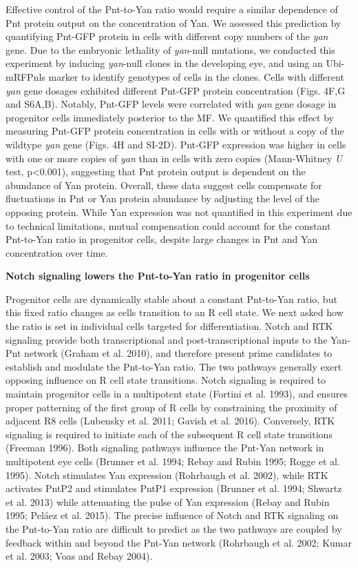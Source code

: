 Effective control of the Pnt-to-Yan ratio would require a similar dependence of Pnt protein output on the concentration of Yan. We assessed this prediction by quantifying Pnt-GFP protein in cells with different copy numbers of the \textit{yan} gene. Due to the embryonic lethality of \textit{yan}-null mutations, we conducted this experiment by inducing \textit{yan}-null clones in the developing eye, and using an Ubi-mRFPnls marker to identify genotypes of cells in the clones. Cells with different \textit{yan} gene dosages exhibited different Pnt-GFP protein concentration (Figs. 4F,G and S6A,B). Notably, Pnt-GFP levels were correlated with \textit{yan} gene dosage in progenitor cells immediately posterior to the MF. We quantified this effect by measuring Pnt-GFP protein concentration in cells with or without a copy of the wildtype \textit{yan} gene (Figs. 4H and SI-2D). Pnt-GFP expression was higher in cells with one or more copies of \textit{yan} than in cells with zero copies (Mann-Whitney \textit{U} test, p\textless{}0.001), suggesting that Pnt protein output is dependent on the abundance of Yan protein. Overall, these data suggest cells compensate for fluctuations in Pnt or Yan protein abundance by adjusting the level of the opposing protein. While Yan expression was not quantified in this experiment due to technical limitations, mutual compensation could account for the constant Pnt-to-Yan ratio in progenitor cells, despite large changes in Pnt and Yan concentration over time.

\textbf{Notch signaling lowers the Pnt-to-Yan ratio in progenitor cells}

Progenitor cells are dynamically stable about a constant Pnt-to-Yan ratio, but this fixed ratio changes as cells transition to an R cell state. We next asked how the ratio is set in individual cells targeted for differentiation. Notch and RTK signaling provide both transcriptional and post-transcriptional inputs to the Yan-Pnt network (Graham et al. 2010), and therefore present prime candidates to establish and modulate the Pnt-to-Yan ratio. The two pathways generally exert opposing influence on R cell state transitions. Notch signaling is required to maintain progenitor cells in a multipotent state (Fortini et al. 1993), and ensures proper patterning of the first group of R cells by constraining the proximity of adjacent R8 cells (Lubensky et al. 2011; Gavish et al. 2016). Conversely, RTK signaling is required to initiate each of the subsequent R cell state transitions (Freeman 1996). Both signaling pathways influence the Pnt-Yan network in multipotent eye cells (Brunner et al. 1994; Rebay and Rubin 1995; Rogge et al. 1995). Notch stimulates Yan expression (Rohrbaugh et al. 2002), while RTK activates PntP2 and stimulates PntP1 expression (Brunner et al. 1994; Shwartz et al. 2013) while attenuating the pulse of Yan expression (Rebay and Rubin 1995; Peláez et al. 2015). The precise influence of Notch and RTK signaling on the Pnt-to-Yan ratio are difficult to predict as the two pathways are coupled by feedback within and beyond the Pnt-Yan network (Rohrbaugh et al. 2002; Kumar et al. 2003; Voas and Rebay 2004).

